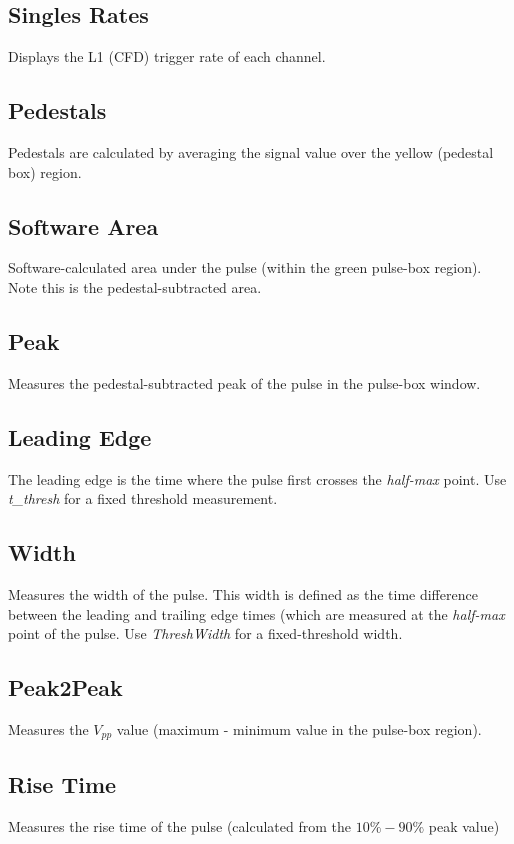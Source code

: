 \documentclass{article}
\begin{document}
\subsection{Singles Rates}
Displays the L1 (CFD) trigger rate of each channel.

\subsection{Pedestals}
Pedestals are calculated by averaging the signal value over the yellow
(pedestal box) region.

\subsection{Software Area}
Software-calculated area under the pulse (within the green pulse-box
region). Note this is the pedestal-subtracted area.

\subsection{Peak}
Measures the pedestal-subtracted peak of the pulse in the pulse-box
window.

\subsection{Leading Edge}
The leading edge is the time where the pulse first crosses the
\emph{half-max} point. Use \emph{t\_thresh} for a fixed threshold
measurement.

\subsection{Width}
Measures the width of the pulse.  This width is defined as the time
difference between the leading and trailing edge times (which are
measured at the \emph{half-max} point of the pulse.  Use
\emph{ThreshWidth} for a fixed-threshold width.

\subsection{Peak2Peak}
Measures the $V_{pp}$ value (maximum - minimum value in the pulse-box
region).

\subsection{Rise Time}
Measures the rise time of the pulse (calculated from the $10\% - 90\%$
peak value)
\end{document}
